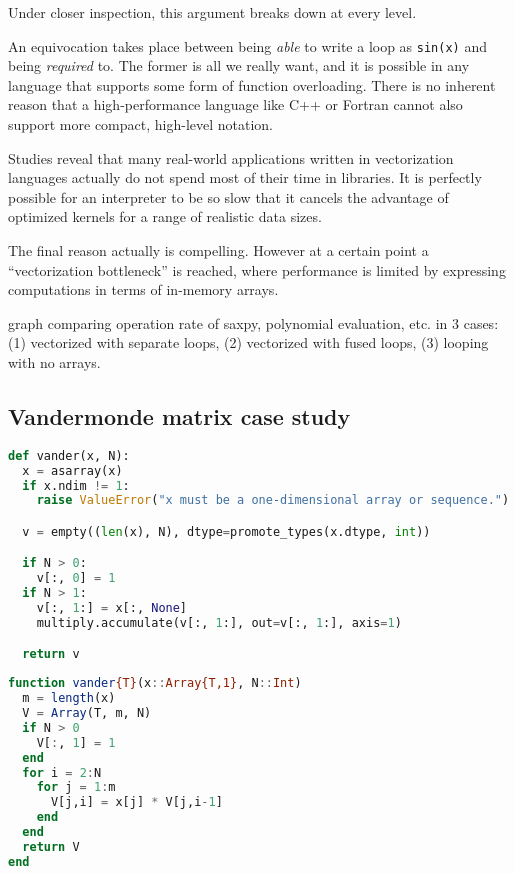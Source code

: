 {Under closer inspection, this argument breaks down at every level.

An equivocation takes place between being \emph{able} to write a loop
as \texttt{sin(x)} and being \emph{required} to.
The former is all we really want, and it is possible in any language that
supports some form of function overloading.
There is no inherent reason that a high-performance language like C++ or
Fortran cannot also support more compact, high-level notation.

Studies reveal that many real-world applications written in vectorization
languages actually do not spend most of their time in libraries. %
It is perfectly possible for an interpreter to be so slow that it cancels
the advantage of optimized kernels for a range of realistic data sizes.

The final reason actually is compelling. However at a certain point a
``vectorization bottleneck'' is reached, where performance is limited by
expressing computations in terms of in-memory arrays.

graph comparing operation rate of saxpy, polynomial evaluation, etc. in 3
cases: (1) vectorized with separate loops, (2) vectorized with fused loops,
(3) looping with no arrays.


\subsection{Vandermonde matrix case study}

\begin{singlespace}
\begin{lstlisting}[language=python,style=ttcode]
def vander(x, N):
  x = asarray(x)
  if x.ndim != 1:
    raise ValueError("x must be a one-dimensional array or sequence.")

  v = empty((len(x), N), dtype=promote_types(x.dtype, int))

  if N > 0:
    v[:, 0] = 1
  if N > 1:
    v[:, 1:] = x[:, None]
    multiply.accumulate(v[:, 1:], out=v[:, 1:], axis=1)

  return v
\end{lstlisting}
\end{singlespace}


\begin{singlespace}
\begin{lstlisting}[language=julia]
function vander{T}(x::Array{T,1}, N::Int)
  m = length(x)
  V = Array(T, m, N)
  if N > 0
    V[:, 1] = 1
  end
  for i = 2:N
    for j = 1:m
      V[j,i] = x[j] * V[j,i-1]
    end
  end
  return V
end
\end{lstlisting}
\end{singlespace}

}
